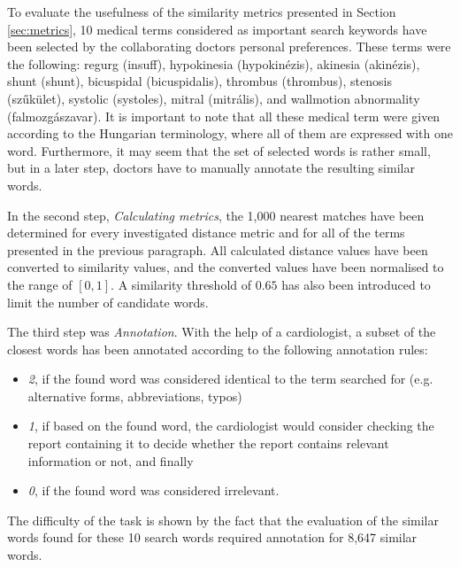 To evaluate the usefulness of the similarity metrics presented in Section \ref{sec:metrics}, 10 medical terms considered as important search keywords have been selected by the collaborating doctors personal preferences. These terms were the following: regurg (insuff), hypokinesia (hypokinézis), akinesia (akinézis), shunt (shunt), bicuspidal (bicuspidalis), thrombus (thrombus), stenosis (szűkület), systolic (systoles), mitral (mitrális), and wallmotion abnormality (falmozgászavar). It is important to note that all these medical term were given according to the Hungarian terminology, where all of them are expressed with one word. Furthermore, it may seem that the set of selected words is rather small, but in a later step, doctors have to manually annotate the resulting similar words.

In the second step, \textit{Calculating metrics}, the 1,000 nearest matches have been determined for every investigated distance metric and for all of the terms presented in the previous paragraph. All calculated distance values have been converted to similarity values, and the converted values have been normalised to the range of $[0,1]$. A similarity threshold of $0.65$ has also been introduced to limit the number of candidate words.



The third step was \textit{Annotation}. With the help of a cardiologist, a subset of the closest words has been annotated according to the following annotation rules:
\begin{itemize}
	\item \textit{2}, if the found word was considered identical to the term searched for (e.g. alternative forms, abbreviations, typos)
	\item \textit{1}, if based on the found word, the cardiologist would consider checking the report containing it to decide whether the report contains relevant information or not, and finally
	\item \textit{0}, if the found word was considered irrelevant.
\end{itemize}
The difficulty of the task is shown by the fact that the evaluation of the similar words found for these 10 search words required annotation for 8,647 similar words.

